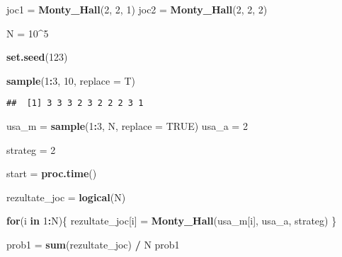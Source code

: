 \documentclass[
]{article}
\newenvironment{Shaded}{\begin{snugshade}}{\end{snugshade}}
\newcommand{\ControlFlowTok}[1]{\textcolor[rgb]{0.13,0.29,0.53}{\textbf{#1}}}
\newcommand{\DataTypeTok}[1]{\textcolor[rgb]{0.13,0.29,0.53}{#1}}
\newcommand{\DecValTok}[1]{\textcolor[rgb]{0.00,0.00,0.81}{#1}}
\newcommand{\KeywordTok}[1]{\textcolor[rgb]{0.13,0.29,0.53}{\textbf{#1}}}
\newcommand{\NormalTok}[1]{#1}
\newcommand{\OperatorTok}[1]{\textcolor[rgb]{0.81,0.36,0.00}{\textbf{#1}}}
\newcommand{\OtherTok}[1]{\textcolor[rgb]{0.56,0.35,0.01}{#1}}
\newcommand{\StringTok}[1]{\textcolor[rgb]{0.31,0.60,0.02}{#1}}
\begin{document}
\begin{Shaded}
\begin{Highlighting}[]
\NormalTok{joc1 =}\StringTok{ }\KeywordTok{Monty_Hall}\NormalTok{(}\DecValTok{2}\NormalTok{, }\DecValTok{2}\NormalTok{, }\DecValTok{1}\NormalTok{)}
\NormalTok{joc2 =}\StringTok{ }\KeywordTok{Monty_Hall}\NormalTok{(}\DecValTok{2}\NormalTok{, }\DecValTok{2}\NormalTok{, }\DecValTok{2}\NormalTok{)}
\end{Highlighting}
\end{Shaded}

\begin{Shaded}
\begin{Highlighting}[]
\NormalTok{N =}\StringTok{ }\DecValTok{10}\OperatorTok{^}\DecValTok{5}

\KeywordTok{set.seed}\NormalTok{(}\DecValTok{123}\NormalTok{)}

\KeywordTok{sample}\NormalTok{(}\DecValTok{1}\OperatorTok{:}\DecValTok{3}\NormalTok{, }\DecValTok{10}\NormalTok{, }\DataTypeTok{replace =}\NormalTok{ T)}
\end{Highlighting}
\end{Shaded}

\begin{verbatim}
##  [1] 3 3 3 2 3 2 2 2 3 1
\end{verbatim}

\begin{Shaded}
\begin{Highlighting}[]
\NormalTok{usa_m =}\StringTok{ }\KeywordTok{sample}\NormalTok{(}\DecValTok{1}\OperatorTok{:}\DecValTok{3}\NormalTok{, N, }\DataTypeTok{replace =} \OtherTok{TRUE}\NormalTok{)}
\NormalTok{usa_a =}\StringTok{ }\DecValTok{2}

\NormalTok{strateg =}\StringTok{ }\DecValTok{2}

\NormalTok{start =}\StringTok{ }\KeywordTok{proc.time}\NormalTok{()}

\NormalTok{rezultate_joc =}\StringTok{ }\KeywordTok{logical}\NormalTok{(N)}

\ControlFlowTok{for}\NormalTok{(i }\ControlFlowTok{in} \DecValTok{1}\OperatorTok{:}\NormalTok{N)\{}
\NormalTok{  rezultate_joc[i] =}\StringTok{ }\KeywordTok{Monty_Hall}\NormalTok{(usa_m[i], usa_a, strateg)}
\NormalTok{\}}

\NormalTok{prob1 =}\StringTok{ }\KeywordTok{sum}\NormalTok{(rezultate_joc) }\OperatorTok{/}\StringTok{ }\NormalTok{N}
\NormalTok{prob1}
\end{Highlighting}
\end{Shaded}
\end{document}
